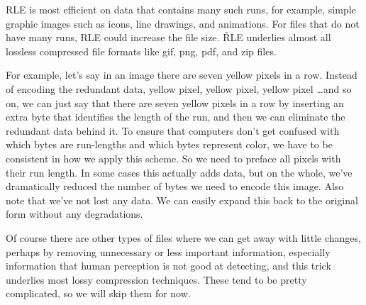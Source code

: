 RLE is most efficient on data that contains many such runs, for example, simple graphic images such as icons, line
drawings, and animations. For files that do not have many runs, RLE could increase the file size. \v

RLE underlies almost all lossless compressed file formats like gif, png, pdf, and zip files.

\be
For example, let's say in an image there are seven yellow pixels in a row. Instead of encoding the redundant data,
yellow pixel, yellow pixel, yellow pixel \ldots and so on, we can just say that there are seven yellow pixels in a
row by inserting an extra byte that identifies the length of the run, and then we can eliminate the redundant data
behind it. To ensure that computers don't get confused with which bytes are run-lengths and which bytes represent
color, we have to be consistent in how we apply this scheme. So we need to preface all pixels with their run length.
In some cases this actually adds data, but on the whole, we've dramatically reduced the number of bytes we need to
encode this image. Also note that we've not lost any data. We can easily expand this back to the original form
without any degradations.
\ee

Of course there are other types of files where we can get away with little changes, perhaps by removing unnecessary
or less important information, especially information that human perception is not good at detecting, and this trick
underlies most lossy compression techniques. These tend to be pretty complicated, so we will skip them for now.